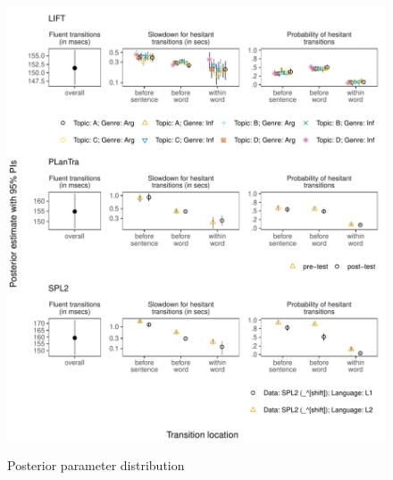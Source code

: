 \begin{appendix}
\begin{figure}[!htb]
\includegraphics{figures/psplots2constr.pdf}
\label{fig:fullps1}
\caption{Posterior parameter distribution}
\end{figure}
\end{appendix}
